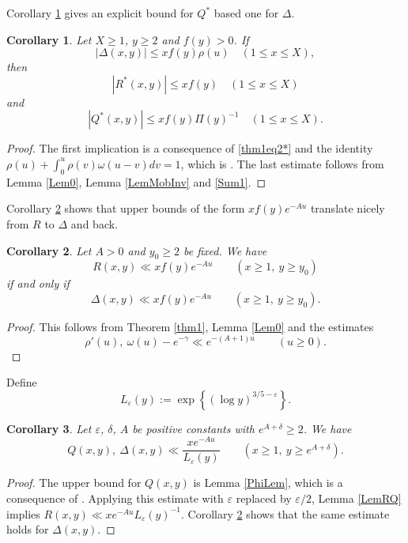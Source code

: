 \documentclass[11pt]{amsart}
\newtheorem{corollary}{Corollary}
\begin{document}
Corollary \ref{corexact2} gives an explicit bound for $Q^*$ based one for $\Delta$. 

\begin{corollary}\label{corexact2}
Let $X\ge 1$, $y\ge 2$ and $f(y)>0$. If 
$$
|\Delta(x,y)| \le x f(y) \rho(u) \quad (1\le x \le  X) ,
$$
then
$$
|R^*(x,y)| \le x f(y)  \quad (1\le  x \le X) 
$$
and 
$$
|Q^*(x,y)| \le x f(y) \Pi(y)^{-1} \quad (1\le x \le  X).
$$
\end{corollary}
\begin{proof}
The first implication is a consequence of \eqref{thm1eq2*} and the 
identity $\rho(u)+\int_0^u \rho(v) \omega(u-v) dv = 1$, which is \cite[Exercise 297]{Ten}.
The last estimate follows from Lemma \ref{Lem0}, Lemma \ref{LemMobInv} and \eqref{Sum1}.
\end{proof}

Corollary \ref{coriff} shows that upper bounds of the form $x f(y) e^{-Au}$   
translate nicely from $R$ to $\Delta$ and back. 

\begin{corollary}\label{coriff}
Let $A>0$ and $y_0\ge 2$ be fixed. We have   
$$
R(x,y)\ll x f(y) e^{-A u} \qquad (x\ge 1,\ y\ge y_0)
$$
if and only if 
$$
\Delta(x,y)\ll x f(y) e^{-A u} \qquad (x\ge 1, \ y\ge y_0).
$$
\end{corollary}
\begin{proof}
This follows from Theorem \ref{thm1}, Lemma \ref{Lem0} and the estimates \cite[Cor III.5.14 \& Cor III.6.5]{Ten}
$$
\rho'(u), \  \omega(u) -e^{-\gamma} \ll e^{-(A+1)u} \qquad (u\ge 0).
$$
\end{proof}

Define
$$
L_\varepsilon(y) := \exp\left\{ (\log  y)^{3/5 - \varepsilon}\right\}.
$$

\begin{corollary}\label{Cor4}
Let $\varepsilon$, $\delta$, $A$ be positive constants with $e^{A+\delta}\ge 2$.
We have
$$
Q(x,y), \ \Delta(x,y) \ll \frac{x e^{-Au}}{L_\varepsilon(y)} \qquad (x\ge 1,\ y\ge e^{A+\delta}).
$$
\end{corollary}

\begin{proof}
The upper bound for $Q(x,y) $ is Lemma \ref{PhiLem}, which is a consequence of \cite[Thm III.6.10]{Ten}. 
Applying this estimate with $\varepsilon$ replaced by 
$\varepsilon/2$, Lemma \ref{LemRQ} implies $R(x,y)\ll x e^{-Au}L_\varepsilon(y)^{-1} $. 
Corollary \ref{coriff} shows that the same estimate holds for $\Delta(x,y)$.
\end{proof}
\end{document}
